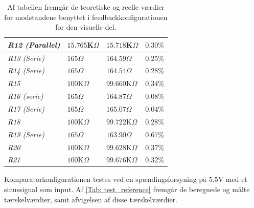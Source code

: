 \begin{table}[H]
\begin{tabular}{|l|l|l|l|}
\textit{R12 (Parallel)} & $15.765$K$\Omega$        & $15.718$K$\Omega$   & $0.30\%$           \\ \hline
\textit{R13 (Serie)}    & $165\Omega$              & $164.59\Omega$      & $0.25\%$           \\ \hline
\textit{R14 (Serie)}    & $165\Omega$              & $164.54\Omega$      & $0.28\%$           \\ \hline
\textit{R15}            & $100$K$\Omega$           & $99.660$K$\Omega$   & $0.34\%$           \\ \hline
\textit{R16 (serie)}    & $165\Omega$              & $164.87\Omega$      & $0.08\%$           \\ \hline
\textit{R17 (Serie)}    & $165\Omega$              & $165.07\Omega$      & $0.04\%$           \\ \hline
\textit{R18}            & $100$K$\Omega$           & $99.722$K$\Omega$   & $0.28\%$           \\ \hline
\textit{R19 (Serie)}    & $165\Omega$              & $163.90\Omega$      & $0.67\%$           \\ \hline
\textit{R20}            & $100$K$\Omega$           & $99.628$K$\Omega$   & $0.37\%$           \\ \hline
\textit{R21}            & $100$K$\Omega$           & $99.676$K$\Omega$   & $0.32\%$           \\ \hline
\end{tabular}
\caption{Af tabellen fremgår de teoretiske og reelle værdier for modstandene benyttet i feedbackkonfigurationen for den visuelle del.}
\label{Tab:komparator_modstande}
\end{table}
\noindent Komparatorkonfigurationen testes ved en spændingsforsyning på $5.5$V med et sinussignal som input. Af \ref{Tab: test_reference} fremgår de beregnede og målte tærskelværdier, samt afvigelsen af disse tærskelværdier. 

